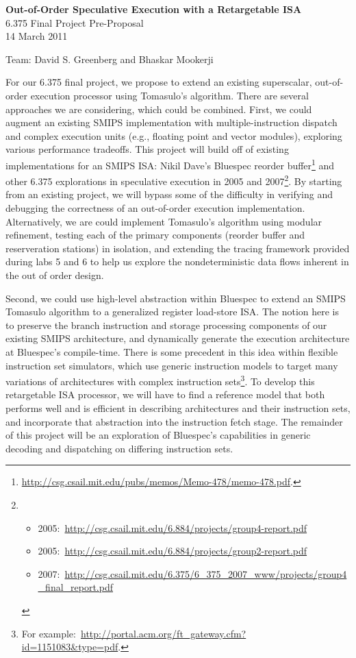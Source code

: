 \documentclass[12pt]{article}
\begin{document}
	\begin{center}
		\textbf{\large Out-of-Order Speculative Execution with a Retargetable ISA } \\
		6.375 Final Project Pre-Proposal\\
		14 March 2011 \\
		
		\vspace{\baselineskip}
		
		Team: David S. Greenberg and Bhaskar Mookerji
	\end{center}
	
	For our 6.375 final project, we propose to extend an existing superscalar, out-of-order execution processor using Tomasulo's algorithm. There are several approaches we are considering, which could be combined. First, we could augment an existing SMIPS implementation with multiple-instruction dispatch and complex execution units (e.g., floating point and vector modules), exploring various performance tradeoffs. This project will build off of existing implementations for an SMIPS ISA: Nikil Dave's  Bluespec reorder buffer\footnote{\url{http://csg.csail.mit.edu/pubs/memos/Memo-478/memo-478.pdf}.} and other 6.375 explorations in speculative execution in 2005 and 2007\footnote{\begin{itemize}
		\item 2005:~\url{http://csg.csail.mit.edu/6.884/projects/group4-report.pdf}
		\item 2005:~\url{http://csg.csail.mit.edu/6.884/projects/group2-report.pdf}
		\item 2007:~\url{http://csg.csail.mit.edu/6.375/6_375_2007_www/projects/group4_final_report.pdf}
	\end{itemize}}. By starting from an existing project, we will bypass some of the difficulty in verifying and debugging the correctness of an out-of-order execution implementation. Alternatively, we are could implement Tomasulo's algorithm using modular refinement, testing each of the primary components (reorder buffer and reserveration stations) in isolation, and extending the tracing framework provided during labs 5 and 6 to help us explore the nondeterministic data flows inherent in the out of order design.
	
	Second, we could use high-level abstraction within Bluespec to extend an SMIPS Tomasulo algorithm to a generalized register load-store ISA. The notion here is to preserve the branch instruction and storage processing components of our existing SMIPS architecture, and dynamically generate the execution architecture at Bluespec's compile-time. There is some precedent in this idea within flexible instruction set simulators, which use generic instruction models to target many variations of architectures with complex instruction sets\footnote{For example:~\url{http://portal.acm.org/ft_gateway.cfm?id=1151083&type=pdf}.}. To develop this retargetable ISA processor, we will have to find a reference model that both performs well and is efficient in describing architectures and their instruction sets, and incorporate that abstraction into the instruction fetch stage. The remainder of this project will be an exploration of Bluespec's capabilities in generic decoding and dispatching on differing instruction sets.
	
\end{document}
